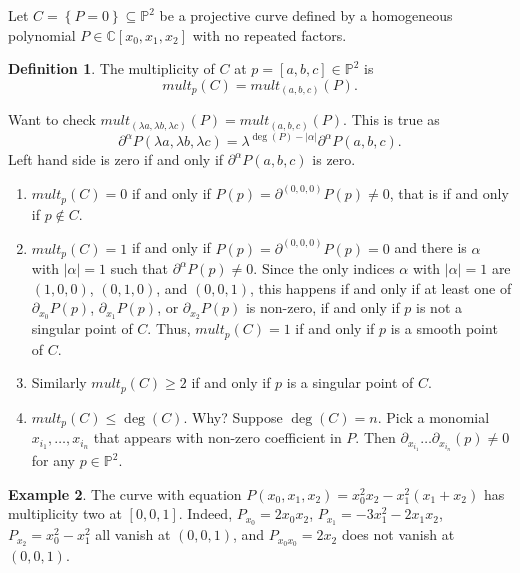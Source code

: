 \documentclass{article}
\newcommand{\C}{\mathbb{C}}
\renewcommand{\P}{\mathbb{P}}
\newcommand{\rb}[1]{\left( #1 \right)}
\renewcommand{\sb}[1]{\left[ #1 \right]}
\newcommand{\cb}[1]{\left\{ #1 \right\}}
\newcommand{\abs}[1]{\left\lvert #1 \right\rvert}
\theoremstyle{definition}\newtheorem{definition}{Definition}[section]
\theoremstyle{definition}\newtheorem{notation}[definition]{Notation}
\theoremstyle{definition}\newtheorem{remark}[definition]{Remark}
\theoremstyle{definition}\newtheorem{example}[definition]{Example}
\theoremstyle{definition}\newtheorem{fact}{Fact}
\theoremstyle{definition}\newtheorem{exercise}{Exercise}
\begin{document}
Let $ C = \cb{P = 0} \subseteq \P^2 $ be a projective curve defined by a homogeneous polynomial $ P \in \C\sb{x_0, x_1, x_2} $ with no repeated factors.

\begin{definition}
The multiplicity of $ C $ at $ p = \sb{a, b, c} \in \P^2 $ is
$$ mult_p\rb{C} = mult_{\rb{a, b, c}}\rb{P}. $$
\end{definition}

Want to check $ mult_{\rb{\lambda a, \lambda b, \lambda c}}\rb{P} = mult_{\rb{a, b, c}}\rb{P} $. This is true as
$$ \partial^\alpha P\rb{\lambda a, \lambda b, \lambda c} = \lambda^{\deg\rb{P} - \abs{\alpha}}\partial^\alpha P\rb{a, b, c}. $$
Left hand side is zero if and only if $ \partial^\alpha P\rb{a, b, c} $ is zero.
\begin{enumerate}
\item $ mult_p\rb{C} = 0 $ if and only if $ P\rb{p} = \partial^{\rb{0, 0, 0}} P\rb{p} \ne 0 $, that is if and only if $ p \notin C $.
\item $ mult_p\rb{C} = 1 $ if and only if $ P\rb{p} = \partial^{\rb{0, 0, 0}} P\rb{p} = 0 $ and there is $ \alpha $ with $ \abs{\alpha} = 1 $ such that $ \partial^{\alpha} P\rb{p} \ne 0 $. Since the only indices $ \alpha $ with $ \abs{\alpha} = 1 $ are $ \rb{1, 0, 0} $, $ \rb{0, 1, 0} $, and $ \rb{0, 0, 1} $, this happens if and only if at least one of $ \partial_{x_0} P\rb{p} $, $ \partial_{x_1} P\rb{p} $, or $ \partial_{x_2} P\rb{p} $ is non-zero, if and only if $ p $ is not a singular point of $ C $. Thus, $ mult_p\rb{C} = 1 $ if and only if $ p $ is a smooth point of $ C $.
\item Similarly $ mult_p\rb{C} \ge 2 $ if and only if $ p $ is a singular point of $ C $.
\item $ mult_p\rb{C} \le \deg\rb{C} $. Why? Suppose $ \deg\rb{C} = n $. Pick a monomial $ x_{i_1}, \dots, x_{i_n} $ that appears with non-zero coefficient in $ P $. Then $ \partial_{x_{i_1}} \dots \partial_{x_{i_n}}\rb{p} \ne 0 $ for any $ p \in \P^2 $.
\end{enumerate}

\begin{example}
The curve with equation $ P\rb{x_0, x_1, x_2} = x_0^2x_2 - x_1^2\rb{x_1 + x_2} $ has multiplicity two at $ \sb{0, 0, 1} $. Indeed, $ P_{x_0} = 2x_0x_2 $, $ P_{x_1} = -3x_1^2 - 2x_1x_2 $, $ P_{x_2} = x_0^2 - x_1^2 $ all vanish at $ \rb{0, 0, 1} $, and $ P_{x_0x_0} = 2x_2 $ does not vanish at $ \rb{0, 0, 1} $.
\end{example}
\end{document}
